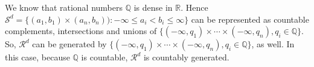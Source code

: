 \documentclass[en, normal, 11pt, black]{elegantnote}
\renewenvironment{proof}{\begin{tcolorbox}[colback=white, colframe=black!50, breakable, title=Proof. ]\setlength{\parskip}{0.8em}}{\\\rightline{$\square$}\end{tcolorbox}}
\begin{document}


    \begin{proof}
        We know that rational numbers $\mathbb{Q}$ is dense in $\mathbb{R}$. Hence $\mathcal{S}^d=\{(a_1,b_1)\times(a_n,b_n)): -\infty\leqslant a_i<b_i\leqslant\infty \}$ can be represented as countable complements, intersections and unions of $\{(-\infty,q_1)\times\cdots\times(-\infty, q_n), q_i\in\mathbb{Q}\}$. So, $\mathcal{R}^d$ can be generated by $\{(-\infty,q_1)\times\cdots\times(-\infty, q_n), q_i\in\mathbb{Q}\}$, as well. In this case, because $\mathbb{Q}$ is countable, $\mathcal{R}^d$ is countably generated. 
    \end{proof}
\end{document}
